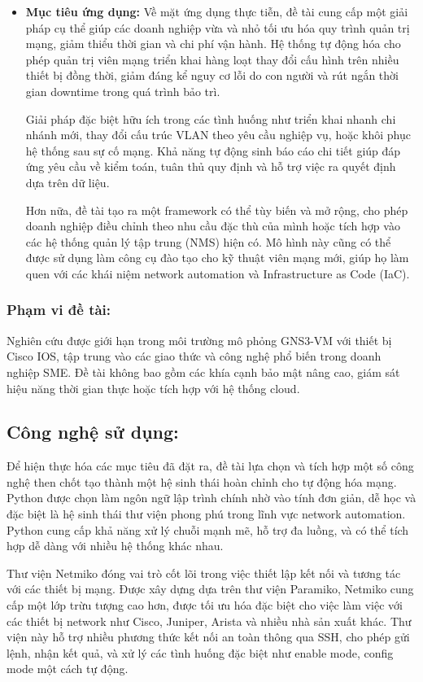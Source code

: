 \begin{itemize}
    \item \textbf{Mục tiêu ứng dụng:} Về mặt ứng dụng thực tiễn, đề tài cung cấp một giải pháp cụ thể giúp các doanh nghiệp vừa và nhỏ tối ưu hóa quy trình quản trị mạng, giảm thiểu thời gian và chi phí vận hành. Hệ thống tự động hóa cho phép quản trị viên mạng triển khai hàng loạt thay đổi cấu hình trên nhiều thiết bị đồng thời, giảm đáng kể nguy cơ lỗi do con người  và rút ngắn thời gian downtime trong quá trình bảo trì.
    
    Giải pháp đặc biệt hữu ích trong các tình huống như triển khai nhanh chi nhánh mới, thay đổi cấu trúc VLAN theo yêu cầu nghiệp vụ, hoặc khôi phục hệ thống sau sự cố mạng. Khả năng tự động sinh báo cáo chi tiết giúp đáp ứng yêu cầu về kiểm toán, tuân thủ quy định  và hỗ trợ việc ra quyết định dựa trên dữ liệu.
    
    Hơn nữa, đề tài tạo ra một framework có thể tùy biến và mở rộng, cho phép doanh nghiệp điều chỉnh theo nhu cầu đặc thù của mình hoặc tích hợp vào các hệ thống quản lý tập trung (NMS) hiện có. Mô hình này cũng có thể được sử dụng làm công cụ đào tạo cho kỹ thuật viên mạng mới, giúp họ làm quen với các khái niệm network automation và Infrastructure as Code (IaC).

\end{itemize}

\subsubsection{Phạm vi đề tài:}
    Nghiên cứu được giới hạn trong môi trường mô phỏng GNS3-VM\cite{GNS3-Documentation} với thiết bị Cisco IOS, tập trung vào các giao thức và công nghệ phổ biến trong doanh nghiệp SME. Đề tài không bao gồm các khía cạnh bảo mật nâng cao, giám sát hiệu năng thời gian thực hoặc tích hợp với hệ thống cloud.

\subsection{Công nghệ sử dụng:}
    Để hiện thực hóa các mục tiêu đã đặt ra, đề tài lựa chọn và tích hợp một số công nghệ then chốt tạo thành một hệ sinh thái hoàn chỉnh cho tự động hóa mạng. Python được chọn làm ngôn ngữ lập trình chính nhờ vào tính đơn giản, dễ học và đặc biệt là hệ sinh thái thư viện phong phú trong lĩnh vực network automation. Python cung cấp khả năng xử lý chuỗi mạnh mẽ, hỗ trợ đa luồng, và có thể tích hợp dễ dàng với nhiều hệ thống khác nhau.
    
    Thư viện Netmiko đóng vai trò cốt lõi trong việc thiết lập kết nối và tương tác với các thiết bị mạng. Được xây dựng dựa trên thư viện Paramiko, Netmiko cung cấp một lớp trừu tượng cao hơn, được tối ưu hóa đặc biệt cho việc làm việc với các thiết bị network như Cisco, Juniper, Arista và nhiều nhà sản xuất khác. Thư viện này hỗ trợ nhiều phương thức kết nối an toàn thông qua SSH, cho phép gửi lệnh, nhận kết quả, và xử lý các tình huống đặc biệt như enable mode, config mode một cách tự động.
    
